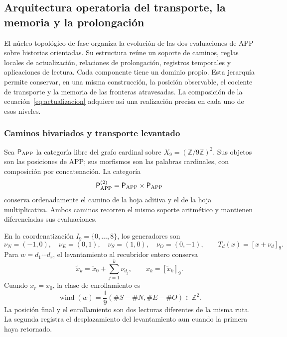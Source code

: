 \subsection{Arquitectura operatoria del transporte, la memoria y la prolongación}
\label{ii:tpk-arquitectura}

El núcleo topológico de fase organiza la evolución de las dos evaluaciones
de APP sobre historias orientadas. Su estructura reúne un soporte de caminos,
reglas locales de actualización, relaciones de prolongación, registros
temporales y aplicaciones de lectura. Cada componente tiene un dominio
propio. Esta jerarquía permite conservar, en una misma construcción, la
posición observable, el cociente de transporte y la memoria de las
fronteras atravesadas. La composición de la ecuación~\eqref{eq:actualizacion}
adquiere así una realización precisa en cada uno de esos niveles.

\subsubsection{Caminos bivariados y transporte levantado}

Sea \(\mathsf P_{\rm APP}\) la categoría libre del grafo cardinal sobre
\(X_9=(\mathbb Z/9\mathbb Z)^2\). Sus objetos son las posiciones de APP;
sus morfismos son las palabras cardinales, con composición por
concatenación. La categoría
\[
 \mathsf P_{\rm APP}^{(2)}
 =\mathsf P_{\rm APP}\times\mathsf P_{\rm APP}
\]
conserva ordenadamente el camino de la hoja aditiva y el de la hoja
multiplicativa. Ambos caminos recorren el mismo soporte aritmético y
mantienen diferenciadas sus evaluaciones.

En la coordenatización \(I_9=\{0,\ldots,8\}\), los generadores son
\[
 \nu_N=(-1,0),\quad\nu_E=(0,1),\quad
 \nu_S=(1,0),\quad\nu_O=(0,-1),
 \qquad T_d(x)=[x+\nu_d]_9.
\]
Para \(w=d_1\cdots d_r\), el levantamiento al recubridor entero conserva
\[
 \widetilde x_k=\widetilde x_0+\sum_{j=1}^{k}\nu_{d_j},
 \qquad x_k=[\widetilde x_k]_9.
\]
Cuando \(x_r=x_0\), la clase de enrollamiento es
\begin{equation}
 \operatorname{wind}(w)
 =\frac{1}{9}(\#S-\#N,\#E-\#O)\in\mathbb Z^2.
 \label{ii:tpk-enrollamiento}
\end{equation}
La posición final y el enrollamiento son dos lecturas diferentes de la
misma ruta. La segunda registra el desplazamiento del levantamiento aun
cuando la primera haya retornado.

